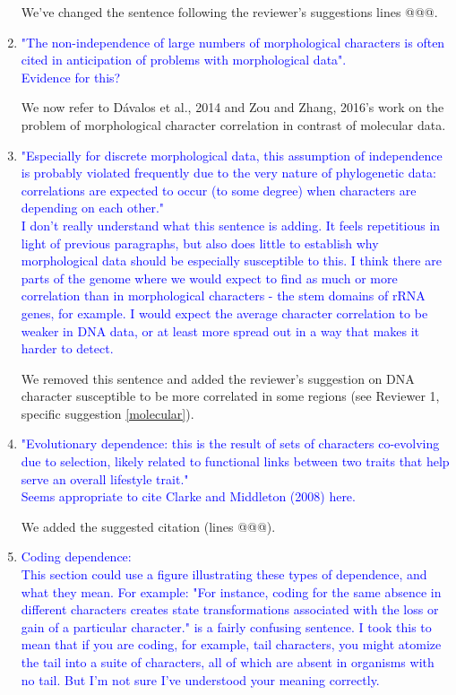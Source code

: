 \documentclass[12pt,letterpaper]{article}
\begin{document}
\begin{enumerate}
We've changed the sentence following the reviewer's suggestions lines @@@.

\item{\textcolor{blue}{"The non-independence of large numbers of morphological characters is often cited in anticipation of problems with morphological data".\\
Evidence for this?}}

We now refer to  D\'{a}valos et al., 2014 and Zou and Zhang, 2016's work on the problem of morphological character correlation in contrast of molecular data.

\item{\textcolor{blue}{"Especially for discrete morphological data, this assumption of independence is probably violated frequently due to the very nature of phylogenetic data: correlations are expected to occur (to some degree) when characters are depending on each other."\\
I don't really understand what this sentence is adding. It feels repetitious in light of previous paragraphs, but also does little to establish why morphological data should be especially susceptible to this. I think there are parts of the genome where we would expect to find as much or more correlation than in morphological characters - the stem domains of rRNA genes, for example. I would expect the average character correlation to be weaker in DNA data, or at least more spread out in a way that makes it harder to detect.}}

We removed this sentence and added the reviewer's suggestion on DNA character susceptible to be more correlated in some regions (see Reviewer 1, specific suggestion \ref{molecular}).

\item{\textcolor{blue}{"Evolutionary dependence: this is the result of sets of characters co-evolving due to selection, likely related to functional links between two traits that help serve an overall lifestyle trait."\\
Seems appropriate to cite Clarke and Middleton (2008) here.}}

We added the suggested citation (lines @@@).

\item{\textcolor{blue}{Coding dependence:\\
This section could use a figure illustrating these types of dependence, and what they mean. For example: "For instance, coding for the same absence in different characters creates state transformations associated with the loss or gain of a particular character." is a fairly confusing sentence. I took this to mean that if you are coding, for example, tail characters, you might atomize the tail into a suite of characters, all of which are absent in organisms with no tail. But I'm not sure I've understood your meaning correctly.}}


\end{enumerate}
\end{document}
